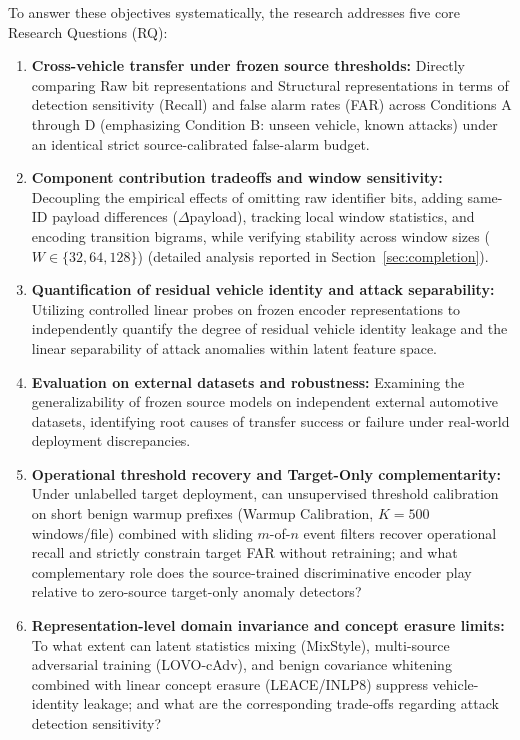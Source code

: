 \documentclass[12pt, a4paper, reqno, oneside]{book}
\begin{document}
To answer these objectives systematically, the research addresses five core Research Questions (RQ):
\begin{enumerate}[label=\textbf{RQ\arabic*:}, leftmargin=*]
    \item \textbf{Cross-vehicle transfer under frozen source thresholds:} Directly comparing Raw bit representations and Structural representations in terms of detection sensitivity (Recall) and false alarm rates (FAR) across Conditions A through D (emphasizing Condition B: unseen vehicle, known attacks) under an identical strict source-calibrated false-alarm budget.
    \item \textbf{Component contribution tradeoffs and window sensitivity:} Decoupling the empirical effects of omitting raw identifier bits, adding same-ID payload differences ($\Delta$payload), tracking local window statistics, and encoding transition bigrams, while verifying stability across window sizes ($W \in \{32, 64, 128\}$) (detailed analysis reported in Section~\ref{sec:completion}).
    \item \textbf{Quantification of residual vehicle identity and attack separability:} Utilizing controlled linear probes on frozen encoder representations to independently quantify the degree of residual vehicle identity leakage and the linear separability of attack anomalies within latent feature space.
    \item \textbf{Evaluation on external datasets and robustness:} Examining the generalizability of frozen source models on independent external automotive datasets, identifying root causes of transfer success or failure under real-world deployment discrepancies.
    \item[\textbf{RQ5a:}] \textbf{Operational threshold recovery and Target-Only complementarity:} Under unlabelled target deployment, can unsupervised threshold calibration on short benign warmup prefixes (Warmup Calibration, $K=500$ windows/file) combined with sliding $m$-of-$n$ event filters recover operational recall and strictly constrain target FAR without retraining; and what complementary role does the source-trained discriminative encoder play relative to zero-source target-only anomaly detectors?
    \item[\textbf{RQ5b:}] \textbf{Representation-level domain invariance and concept erasure limits:} To what extent can latent statistics mixing (MixStyle), multi-source adversarial training (LOVO-cAdv), and benign covariance whitening combined with linear concept erasure (LEACE/INLP8) suppress vehicle-identity leakage; and what are the corresponding trade-offs regarding attack detection sensitivity?
\end{enumerate}
\end{document}
